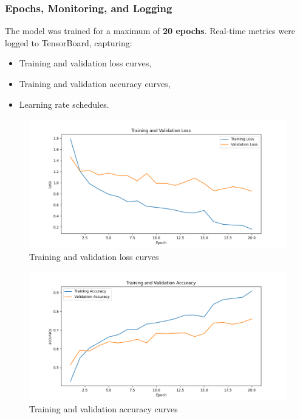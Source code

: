 \documentclass[
  12pt,
  oneside]{article}
\providecommand{\tightlist}{%
  \setlength{\itemsep}{0pt}\setlength{\parskip}{0pt}}
\begin{document}
\subsubsection{Epochs, Monitoring, and
Logging}\label{epochs-monitoring-and-logging}

The model was trained for a maximum of \textbf{20 epochs}. Real-time
metrics were logged to TensorBoard, capturing:

\begin{itemize}
\tightlist
\item
  Training and validation loss curves,
\item
  Training and validation accuracy curves,
\item
  Learning rate schedules.
\end{itemize}

\begin{figure}

{\centering \includegraphics[width=1\linewidth]{loss_curve_v3} 

}

\caption{Training and validation loss curves}\label{fig:unnamed-chunk-5}
\end{figure}

\begin{figure}

{\centering \includegraphics[width=1\linewidth]{accuracy_curve_v3} 

}

\caption{Training and validation accuracy curves}\label{fig:unnamed-chunk-6}
\end{figure}
\end{document}
